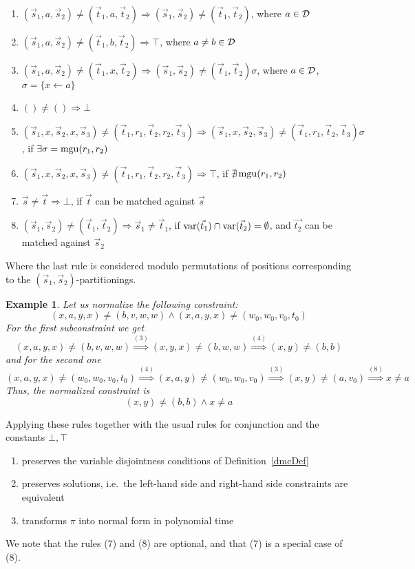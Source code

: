 \documentclass[a4paper]{article}
\newtheorem{example}[defi]{Example}
\begin{document}
\begin{enumerate}
	\item $(\vec{s}_1, a, \vec{s}_2) \ne (\vec{t}_1, a, \vec{t}_2) \Rightarrow (\vec{s}_1, \vec{s}_2) \ne (\vec{t}_1, \vec{t}_2)$, 
		where $a \in \mathcal{D}$
	\item $(\vec{s}_1, a, \vec{s}_2) \ne (\vec{t}_1, b, \vec{t}_2) \Rightarrow \top$, 
		where $a \ne b \in \mathcal{D}$
	\item $(\vec{s}_1, a, \vec{s}_2) \ne (\vec{t}_1, x, \vec{t}_2) \Rightarrow (\vec{s}_1, \vec{s}_2) \ne (\vec{t}_1, \vec{t}_2)\sigma$, 
		where $a \in \mathcal{D}$, $\sigma = \{ x \gets a\}$
	\item $() \ne () \Rightarrow \bot$
	\item $(\vec{s}_1, x, \vec{s}_2, x, \vec{s}_3) \ne (\vec{t}_1, r_1, \vec{t}_2, r_2, \vec{t}_3) \Rightarrow (\vec{s}_1, x, \vec{s}_2, \vec{s}_3) \ne (\vec{t}_1, r_1, \vec{t}_2, \vec{t}_3)\sigma$, 
		if $\exists \sigma = \operatorname{mgu}(r_1,r_2)$
	\item $(\vec{s}_1, x, \vec{s}_2, x, \vec{s}_3) \ne (\vec{t}_1, r_1, \vec{t}_2, r_2, \vec{t}_3) \Rightarrow \top$, 
		if $\nexists\operatorname{mgu}(r_1,r_2)$
	\item $\vec{s} \ne \vec{t} \Rightarrow \bot$, 
		if $\vec{t}$ can be matched against $\vec{s}$
	\item $(\vec{s}_1, \vec{s}_2) \ne (\vec{t}_1, \vec{t}_2) \Rightarrow \vec{s}_1 \ne \vec{t}_1$,
		if $\operatorname{var}(\vec{t}_1) \cap \operatorname{var}(\vec{t}_2) = \emptyset$, and $\vec{t_2}$ can be matched against $\vec{s}_2$ 
		
\end{enumerate}
Where the last rule is considered modulo permutations of positions corresponding to the $(\vec{s}_1, \vec{s}_2)$-partitionings.
\begin{example} Let us normalize the following constraint: 
\[(x,a,y,x) \ne (b, v, w, w) \land (x,a,y,x) \ne (w_0, w_0, v_0, t_0)\]
For the first subconstraint we get
\[(x,a,y,x) \ne (b, v, w, w) \stackrel{(3)}{\Rightarrow} (x,y,x) \ne (b, w, w) \stackrel{(4)}{\Rightarrow} (x,y) \ne (b,b)\]
and for the second one
\[(x,a,y,x) \ne (w_0, w_0, v_0, t_0) \stackrel{(4)}{\Rightarrow} (x,a,y) \ne (w_0, w_0, v_0) 
\stackrel{(3)}{\Rightarrow} (x,y) \ne (a, v_0) \stackrel{(8)}{\Rightarrow} x \ne a\]
Thus, the normalized constraint is
\[(x,y) \ne (b,b) \land x \ne a\]
\end{example}
Applying these rules together with the usual rules for conjunction and the constants $\bot, \top$
\begin{enumerate}
	\item preserves the variable disjointness conditions of Definition~\ref{dmcDef}
	\item preserves solutions, i.e.\ the left-hand side and right-hand side constraints are equivalent
	\item transforms $\pi$ into normal form in polynomial time \end{enumerate}
We note that the rules (7) and (8) are optional, and that (7) is a special case of (8).
\end{document}
